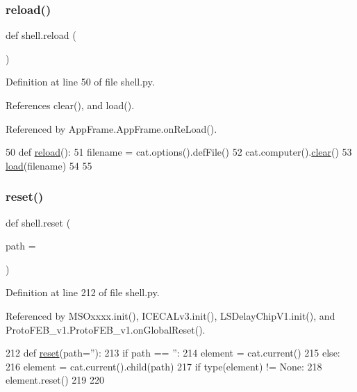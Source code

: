 \subsubsection{\texorpdfstring{reload()}{reload()}}
{\footnotesize\ttfamily def shell.\+reload (\begin{DoxyParamCaption}{ }\end{DoxyParamCaption})}



Definition at line 50 of file shell.\+py.



References clear(), and load().



Referenced by App\+Frame.\+App\+Frame.\+on\+Re\+Load().


\begin{DoxyCode}
50 \textcolor{keyword}{def }\hyperlink{namespaceshell_a406c1a03890c85fe979d6d8e540b3bdf}{reload}():
51   filename = cat.options().defFile()
52   cat.computer().\hyperlink{namespaceshell_a14da1173b3cc5b8569cc0020130e3bd7}{clear}()
53   \hyperlink{namespaceshell_af9ea9dab4000d08fadcd5fed31b64911}{load}(filename)
54 
55 
\end{DoxyCode}
\mbox{\label{namespaceshell_a2f31bbe4baf894f4863c4d392239ab8b}} 
\subsubsection{\texorpdfstring{reset()}{reset()}}
{\footnotesize\ttfamily def shell.\+reset (\begin{DoxyParamCaption}\item[{}]{path = {\ttfamily \textquotesingle{}\textquotesingle{}} }\end{DoxyParamCaption})}



Definition at line 212 of file shell.\+py.



Referenced by M\+S\+Oxxxx.\+init(), I\+C\+E\+C\+A\+Lv3.\+init(), L\+S\+Delay\+Chip\+V1.\+init(), and Proto\+F\+E\+B\+\_\+v1.\+Proto\+F\+E\+B\+\_\+v1.\+on\+Global\+Reset().


\begin{DoxyCode}
212 \textcolor{keyword}{def }\hyperlink{namespaceshell_a2f31bbe4baf894f4863c4d392239ab8b}{reset}(path=''):
213   \textcolor{keywordflow}{if} path == \textcolor{stringliteral}{''}:
214     element = cat.current()
215   \textcolor{keywordflow}{else}:
216     element = cat.current().child(path)
217   \textcolor{keywordflow}{if} type(element) != \textcolor{keywordtype}{None}:
218     element.reset()
219 
220 
\end{DoxyCode}
\mbox{\label{namespaceshell_ac89ea08a5e75ecb222fe9e707b3ee102}} 
